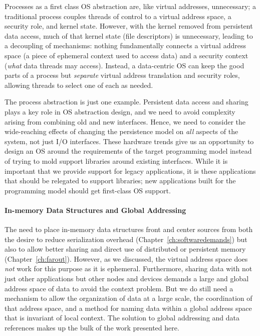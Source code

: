 Processes as a first class OS abstraction are, like virtual addresses, unnecessary; a traditional process couples
threads of control to a virtual address space, a security role, and kernel state.
However, with the kernel removed from
persistent data access, much of that kernel state (\eg file descriptors) is unnecessary,
leading to a decoupling of mechanisms:
nothing fundamentally connects a virtual address space
(a piece of ephemeral context used to access data) and a security context (\emph{what} data
threads may access).
Instead, a data-centric OS can keep the good parts of a process but \emph{separate} virtual address
translation and security roles, allowing threads to select one of each as needed.

The process abstraction is just one example. Persistent data access and sharing plays a key role in OS
abstraction design, and we need to avoid complexity arising from combining old and new interfaces.
Hence, we need to consider the
wide-reaching effects of changing the persistence model on \emph{all} aspects of the system, not
just I/O interfaces. These hardware trends give us an opportunity to design an OS around the requirements
of the target programming model instead of trying to mold support libraries around existing
interfaces. While it is important that we provide support for legacy applications,
it is these applications that should be relegated to support libraries; new applications built for
the programming model should get first-class OS support.


\paragraph{In-memory Data Structures and Global Addressing}
The need to place in-memory data structures front and center sources from both the desire to reduce serialization
overhead (Chapter~\ref{ch:softwaredemands}) but also to allow better sharing and direct use of distributed or persistent
memory (Chapter~\ref{ch:farout}). However, as we discussed, the virtual address space does \emph{not} work for this
purpose as it is ephemeral.
Furthermore, sharing data with not just other applications but other nodes and devices demands a large and global
address space of data to avoid the context problem. But
we do still need a mechanism to allow the organization of data at a large scale, the coordination of that address space,
and a method for naming data within a global address space that is invariant of local context. The solution to global
addressing and data references makes up the bulk of the work presented here.


